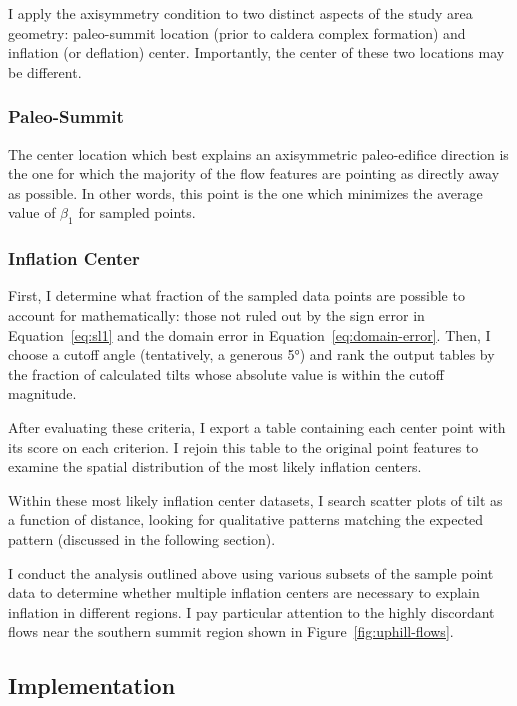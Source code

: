 I apply the axisymmetry condition to two distinct aspects of the study area geometry: paleo-summit location (prior to caldera complex formation) and inflation (or deflation) center. Importantly, the center of these two locations may be different.

\subsubsection{Paleo-Summit}

The center location which best explains an axisymmetric paleo-edifice direction is the one for which the majority of the flow features are pointing as directly away as possible. In other words, this point is the one which minimizes the average value of $\beta_1$ for sampled points.

\subsubsection{Inflation Center}

First, I determine what fraction of the sampled data points are possible to account for mathematically: those not ruled out by the sign error in Equation~\eqref{eq:sl1} and the domain error in Equation~\eqref{eq:domain-error}. Then, I choose a cutoff angle (tentatively, a generous \ang{5}) and rank the output tables by the fraction of calculated tilts whose absolute value is within the cutoff magnitude. 

After evaluating these criteria, I export a table containing each center point with its score on each criterion. I rejoin this table to the original point features to examine the spatial distribution of the most likely inflation centers.

Within these most likely inflation center datasets, I search scatter plots of tilt as a function of distance, looking for qualitative patterns matching the expected pattern (discussed in the following section).

I conduct the analysis outlined above using various subsets of the sample point data to determine whether multiple inflation centers are necessary to explain inflation in different regions. I pay particular attention to the highly discordant flows near the southern summit region shown in Figure~\ref{fig:uphill-flows}.


\subsection{Implementation}


